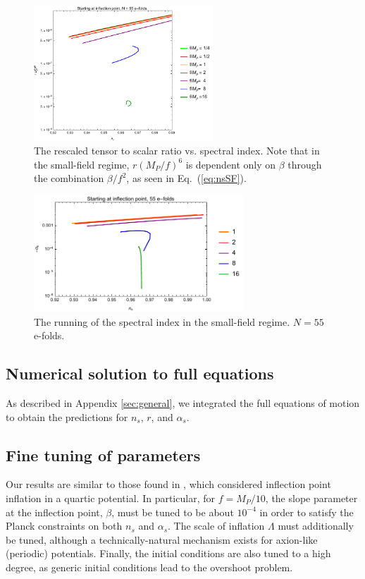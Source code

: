 \documentclass[aps,amsfonts,amsmath,prd,preprint,nofootinbib,superscriptaddress]{revtex4}
\newcommand{\Mp}{{M_{P}}}
\begin{document}
\begin{figure}[!h]
  \centering
    \includegraphics[width=0.6\textwidth]{figures/nsrf6plotvsf.pdf}
    \caption{The rescaled tensor to scalar ratio vs. spectral index. Note that in the small-field regime, $r (\Mp/f)^6$ is dependent only on $\beta$ through the combination $\beta/f^2$, as seen in Eq.~(\ref{eq:nsSF}).}
\end{figure}




\begin{figure}[!h]
  \centering
    \includegraphics[width=0.7\textwidth]{figures/alphasvsnsplot.pdf}
    \caption{The running of the spectral index in the small-field regime.  $N = 55$ e-folds.}
\end{figure}

\subsection{Numerical solution to full equations}

As described in Appendix \ref{sec:general}, we integrated the full equations of motion to obtain the predictions for $n_s$, $r$, and $\alpha_s$.  







\subsection{Fine tuning of parameters}
Our results are similar to those found in \cite{Musoke:2017frr}, which considered inflection point inflation in a quartic potential.  In particular, for $f = \Mp/10$, the slope parameter at the inflection point, $\beta$, must be
tuned to be about $10^{-4}$ in order to satisfy the Planck constraints on both $n_s$ and $\alpha_s$.  The scale of inflation $\Lambda$ must additionally be tuned, although a technically-natural mechanism exists for axion-like (periodic) potentials.  Finally, the initial conditions are also tuned to a high degree, as generic initial conditions lead to the overshoot problem.
\end{document}
